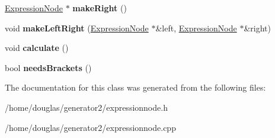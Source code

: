 \begin{DoxyCompactItemize}
\item 
\hyperlink{classExpressionNode}{Expression\+Node} $\ast$ {\bfseries make\+Right} ()\hypertarget{classExpressionNode_a3459476af2378d8fd527163eec8cf817}{}\label{classExpressionNode_a3459476af2378d8fd527163eec8cf817}

\item 
void {\bfseries make\+Left\+Right} (\hyperlink{classExpressionNode}{Expression\+Node} $\ast$\&left, \hyperlink{classExpressionNode}{Expression\+Node} $\ast$\&right)\hypertarget{classExpressionNode_adf695e49175ef44d4e72bf5ca4bb732b}{}\label{classExpressionNode_adf695e49175ef44d4e72bf5ca4bb732b}

\item 
void {\bfseries calculate} ()\hypertarget{classExpressionNode_a3d26b43626f1126b30a2b441cdeeb91a}{}\label{classExpressionNode_a3d26b43626f1126b30a2b441cdeeb91a}

\item 
bool {\bfseries needs\+Brackets} ()\hypertarget{classExpressionNode_ae6011ffc9d0ba7cb9b396d0b3102acb0}{}\label{classExpressionNode_ae6011ffc9d0ba7cb9b396d0b3102acb0}

\end{DoxyCompactItemize}


The documentation for this class was generated from the following files\+:\begin{DoxyCompactItemize}
\item 
/home/douglas/generator2/expressionnode.\+h\item 
/home/douglas/generator2/expressionnode.\+cpp\end{DoxyCompactItemize}
